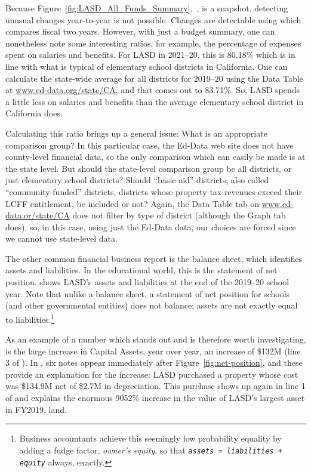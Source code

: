 Because Figure~\ref{fig:LASD_All_Funds_Summary},~, is a snapshot, detecting unusual changes year-to-year is not possible. Changes are detectable using   which compares fiscal two years. However, with just a budget summary, one can nonetheless note some interesting ratios, for example, the percentage of expenses spent on salaries and benefits. For LASD in 2021–20, this is 80.18\% which is in line with what is typical of elementary school districts in California. One can calculate the state-wide average for all districts for 2019–20 using the Data Table at \url{www.ed-data.org/state/CA}, and that comes out to 83.71\%. So, LASD spends a little less on salaries and benefits than the average elementary school district in California does.

Calculating this ratio brings up a general issue: What is an appropriate comparison group? In this particular case, the Ed-Data web site does not have county-level financial data, so the only comparison which can easily be made is at the state level. But should the state-level comparison group be all districts, or just elementary school districts? Should ``basic aid'' districts, also called ``community-funded'' districts, districts whose property tax revenues exceed their LCFF entitlement, be included or not? Again, the Data Table tab on \url{www.ed-data.or/state/CA} does not filter by type of district (although the Graph tab does), so, in this case, using just the Ed-Data data, our choices are forced since we cannot use state-level data.

The other common financial business report is the balance sheet, which identifies assets and liabilities. In the educational world, this is the statement of net position.  shows LASD's assets and liabilities at the end of the 2019–20 school year. Note that unlike a balance sheet, a statement of net position for schools (and other governmental entities) does not balance; assets are not exactly equal to liabilities.\footnote{Business accountants achieve this seemingly low probability equality by adding a fudge factor, \textit{owner's equity}, so that \texttt{\textit{assets = liabilities + equity}} always, exactly.}

As an example of a number which stands out and is therefore worth investigating, is the large increase in Capital Assets, year over year, an increase of \$132M (line 3 of ). In , six notes appear immediately after Figure~\ref{fig:net-position}, and these provide an explanation for the increase: LASD purchased a property whose cost was \$134.9M net of \$2.7M in depreciation. This purchase shows up again in line 1 of  and explains the enormous 9052\% increase in the value of LASD's largest asset in FY2019, land.

